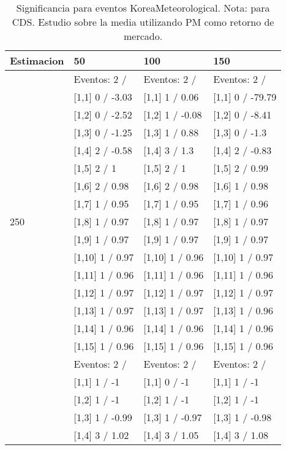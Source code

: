 \begin{table}

\caption{Significancia para eventos KoreaMeteorological. Nota: para CDS. Estudio sobre la media utilizando PM como retorno de mercado.}
\centering
\begin{tabular}[t]{llll}
\toprule
Estimacion & 50 & 100 & 150\\
\midrule
 & Eventos:  2 / & Eventos:  2 / & Eventos:  2 /\\
 & {}[1,1] 0  / -3.03 & {}[1,1] 1  / 0.06 & {}[1,1] 0  / -79.79\\
 & {}[1,2] 0  / -2.52 & {}[1,2] 1  / -0.08 & {}[1,2] 0  / -8.41\\
 & {}[1,3] 0  / -1.25 & {}[1,3] 1  / 0.88 & {}[1,3] 0  / -1.3\\
 & {}[1,4] 2  / -0.58 & {}[1,4] 3  / 1.3 & {}[1,4] 2  / -0.83\\
\addlinespace
 & {}[1,5] 2  / 1 & {}[1,5] 2  / 1 & {}[1,5] 2  / 0.99\\
 & {}[1,6] 2  / 0.98 & {}[1,6] 2  / 0.98 & {}[1,6] 1  / 0.98\\
 & {}[1,7] 1  / 0.95 & {}[1,7] 1  / 0.95 & {}[1,7] 1  / 0.96\\
250 & {}[1,8] 1  / 0.97 & {}[1,8] 1  / 0.97 & {}[1,8] 1  / 0.97\\
 & {}[1,9] 1  / 0.97 & {}[1,9] 1  / 0.97 & {}[1,9] 1  / 0.97\\
\addlinespace
 & {}[1,10] 1  / 0.97 & {}[1,10] 1  / 0.96 & {}[1,10] 1  / 0.97\\
 & {}[1,11] 1  / 0.96 & {}[1,11] 1  / 0.96 & {}[1,11] 1  / 0.96\\
 & {}[1,12] 1  / 0.97 & {}[1,12] 1  / 0.97 & {}[1,12] 1  / 0.97\\
 & {}[1,13] 1  / 0.97 & {}[1,13] 1  / 0.97 & {}[1,13] 1  / 0.96\\
 & {}[1,14] 1  / 0.96 & {}[1,14] 1  / 0.96 & {}[1,14] 1  / 0.96\\
\addlinespace
 & {}[1,15] 1  / 0.96 & {}[1,15] 1  / 0.96 & {}[1,15] 1  / 0.96\\
 & Eventos:  2 / & Eventos:  2 / & Eventos:  2 /\\
 & {}[1,1] 1  / -1 & {}[1,1] 0  / -1 & {}[1,1] 1  / -1\\
 & {}[1,2] 1  / -1 & {}[1,2] 1  / -1 & {}[1,2] 1  / -1\\
 & {}[1,3] 1  / -0.99 & {}[1,3] 1  / -0.97 & {}[1,3] 1  / -0.98\\
\addlinespace
 & {}[1,4] 3  / 1.02 & {}[1,4] 3  / 1.05 & {}[1,4] 3  / 1.08\\

\end{tabular}
\end{table}
